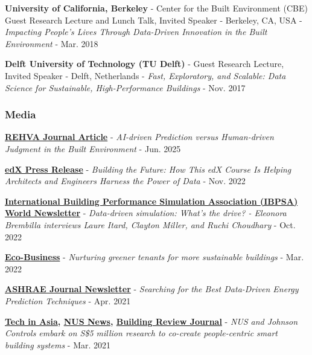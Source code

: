 \documentclass[10pt,a4paper]{article}
\begin{document}
\begin{small}
\begin{etaremune}
\item
\textbf{University of California, Berkeley} - Center for the Built Environment (CBE) Guest Research Lecture and Lunch Talk, Invited Speaker - Berkeley, CA, USA - \emph{Impacting People’s Lives Through Data-Driven Innovation in the Built Environment} - Mar. 2018
\item
\textbf{Delft University of Technology (TU Delft)} - Guest Research Lecture, Invited Speaker - Delft, Netherlands - \emph{Fast, Exploratory, and Scalable: Data Science for Sustainable, High-Performance Buildings} - Nov. 2017
\end{etaremune}


\subsubsection*{Media}
\begin{etaremune}
\item 
\textbf{\href{https://www.rehva.eu/rehva-journal/chapter/ai-driven-prediction-versus-human-driven-judgment-in-the-built-environment}{REHVA Journal Article}} - \emph{AI-driven Prediction versus Human-driven Judgment in the Built Environment} - Jun. 2025
\item
\textbf{\href{https://press.edx.org/building-the-future-how-this-edx-course-is-helping-architects-and-engineers-harness-the-power-of-data}{edX Press Release}} - \emph{Building the Future: How This edX Course Is Helping Architects and Engineers Harness the Power of Data} - Nov. 2022
\item
\textbf{\href{https://issuu.com/eleonorabrembilla/docs/ibpsa_news_32-2}{International Building Performance Simulation Association (IBPSA) World Newsletter}} - \emph{Data-driven simulation: What’s the drive? - Eleonora Brembilla interviews Laure Itard, Clayton Miller, and
Ruchi Choudhary} - Oct. 2022
\item
\textbf{\href{https://www.eco-business.com/news/nurturing-greener-tenants-for-more-sustainable-buildings/}{Eco-Business}} - \emph{Nurturing greener tenants for more sustainable buildings} - Mar. 2022
\item
\textbf{\href{https://www.ashrae.org/news/ashraejournal/searching-for-the-best-data-driven-energy-prediction-techniques}{ASHRAE Journal Newsletter}} - \emph{Searching for the Best Data-Driven Energy Prediction Techniques} - Apr. 2021
\item
\textbf{\href{https://www.techinasia.com/nus-johnson-controls-invests-37m-smart-buildings-research/amp}{Tech in Asia}, \textcolor{blue}{\textbf{\href{https://news.nus.edu.sg/nus-and-johnson-controls-embark-on-s5-million-research-to-co-create-people-centric-smart-building-systems/}{NUS News}}}, \textbf{\href{https://brj.com.sg/nus-and-johnson-controls-embark-on-s5-million-research-to-co-create-people-centric-smart-building-system/}{Building Review Journal}}} - \emph{NUS and Johnson Controls embark on S\$5 million research to co-create people-centric smart building systems} - Mar. 2021

\end{etaremune}
\end{small}
\end{document}
